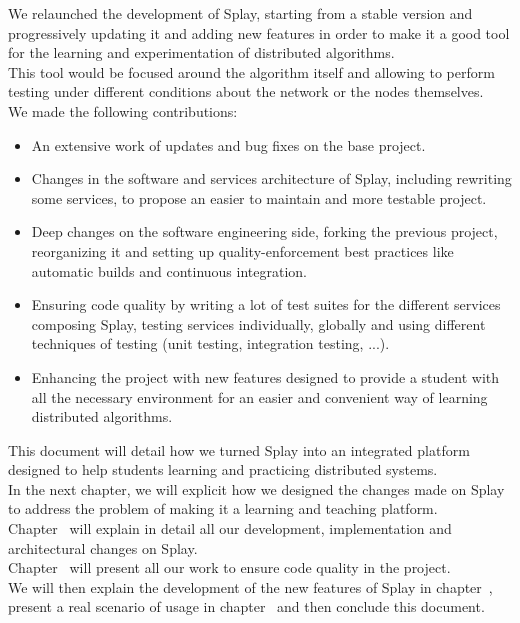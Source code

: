 \documentclass{eplmastersthesis}
\begin{document}
      We relaunched the development of Splay, starting from a stable
      version and progressively updating it and adding new
      features in order to make it a good tool for the learning and
      experimentation of distributed algorithms.\\
      This tool would be focused around the algorithm itself and allowing to
      perform testing under different conditions about the network or
      the nodes themselves.\\

      We made the following contributions:

      \begin{itemize}
        \item An extensive work of updates and bug fixes on the base project.
        \item Changes in the software and services architecture of Splay,
        including rewriting some services, to propose an easier to maintain and
        more testable project.
        \item Deep changes on the software engineering side, forking the
        previous project, reorganizing it and setting up quality-enforcement
        best practices like automatic builds and continuous integration.
        \item Ensuring code quality by writing a lot of test suites for the
        different services composing Splay, testing services individually,
        globally and using different techniques of testing (unit testing,
        integration testing, ...).
        \item Enhancing the project with new features designed to provide a
        student with all the necessary environment for an easier and convenient
        way of learning distributed algorithms.
      \end{itemize}

      This document will detail how we turned Splay into an integrated platform
      designed to help students learning and practicing distributed systems.\\
      In the next chapter, we will explicit how we designed the changes made on
      Splay to address the problem of making it a learning and teaching
      platform.\\
      Chapter~\cite{chap:dev} will explain in detail all our development,
      implementation and architectural changes on Splay.\\
      Chapter~\cite{chap:qual} will present all our work to ensure code quality
      in the project.\\
      We will then explain the development of the new features
      of Splay in chapter~\cite{chap:newfeat}, present a real scenario of usage
      in chapter~\cite{chap:usercase} and then conclude this document.
\end{document}
